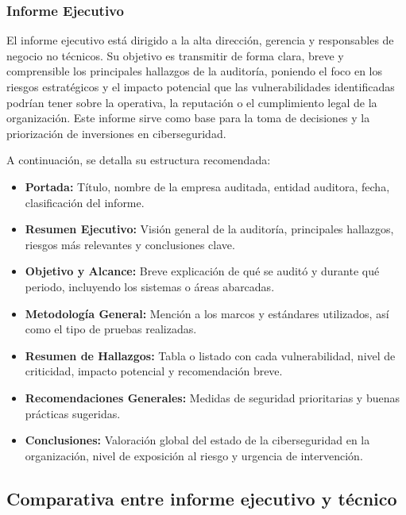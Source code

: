 \documentclass[a4paper, 11pt]{article}
\begin{document}
\vspace{0.5cm}

\subsubsection{Informe Ejecutivo}

El informe ejecutivo está dirigido a la alta dirección, gerencia y responsables de negocio no técnicos. Su objetivo es transmitir de forma clara, breve y comprensible los principales hallazgos de la auditoría, poniendo el foco en los riesgos estratégicos y el impacto potencial que las vulnerabilidades identificadas podrían tener sobre la operativa, la reputación o el cumplimiento legal de la organización. Este informe sirve como base para la toma de decisiones y la priorización de inversiones en ciberseguridad.
\vspace{0.5cm}

A continuación, se detalla su estructura recomendada:

\begin{itemize}
  \item \textbf{Portada:} Título, nombre de la empresa auditada, entidad auditora, fecha, clasificación del informe.
  \item \textbf{Resumen Ejecutivo:} Visión general de la auditoría, principales hallazgos, riesgos más relevantes y conclusiones clave.
  \item \textbf{Objetivo y Alcance:} Breve explicación de qué se auditó y durante qué periodo, incluyendo los sistemas o áreas abarcadas.
  \item \textbf{Metodología General:} Mención a los marcos y estándares utilizados, así como el tipo de pruebas realizadas.
  \item \textbf{Resumen de Hallazgos:} Tabla o listado con cada vulnerabilidad, nivel de criticidad, impacto potencial y recomendación breve.
  \item \textbf{Recomendaciones Generales:} Medidas de seguridad prioritarias y buenas prácticas sugeridas.
  \item \textbf{Conclusiones:} Valoración global del estado de la ciberseguridad en la organización, nivel de exposición al riesgo y urgencia de intervención.
\end{itemize}





\subsection*{Comparativa entre informe ejecutivo y técnico}
\end{document}
